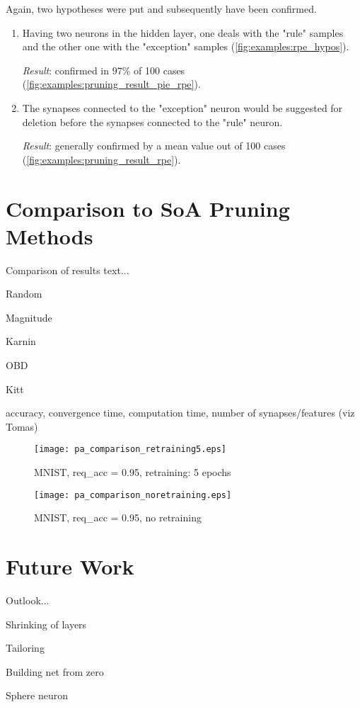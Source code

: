 Again, two hypotheses were put and subsequently have been confirmed.

\begin{enumerate}
\item Having two neurons in the hidden layer, one deals with the "rule" samples and the other one with the "exception" samples (\cref{fig:examples:rpe_hypos}).

\textit{Result}: confirmed in $ 97\% $ of 100 cases (\cref{fig:examples:pruning_result_pie_rpe}).

\item The synapses connected to the "exception" neuron would be suggested for deletion before the synapses connected to the "rule" neuron.

\textit{Result}: generally confirmed by a mean value out of 100 cases (\cref{fig:examples:pruning_result_rpe}).
\end{enumerate}


\section{Comparison to SoA Pruning Methods} \label{sec:comparison_of_pruning_methods}
Comparison of results text...

Random

Magnitude

Karnin

OBD

Kitt
\newpage

accuracy, convergence time, computation time, number of synapses/features (viz Tomas)

\begin{figure}[H]
\centering
\texttt{[image: pa\_comparison\_retraining5.eps]}
\caption{MNIST, req\_acc = 0.95, retraining: 5 epochs}
\label{fig:discussion:pa_comparison_retraining5}
\end{figure}

\newpage

\begin{figure}[H]
\centering
\texttt{[image: pa\_comparison\_noretraining.eps]}
\caption{MNIST, req\_acc = 0.95, no retraining}
\label{fig:discussion:pa_comparison_noretraining}
\end{figure}

\section{Future Work} \label{sec:future_work}
Outlook...

Shrinking of layers

Tailoring

Building net from zero

Sphere neuron